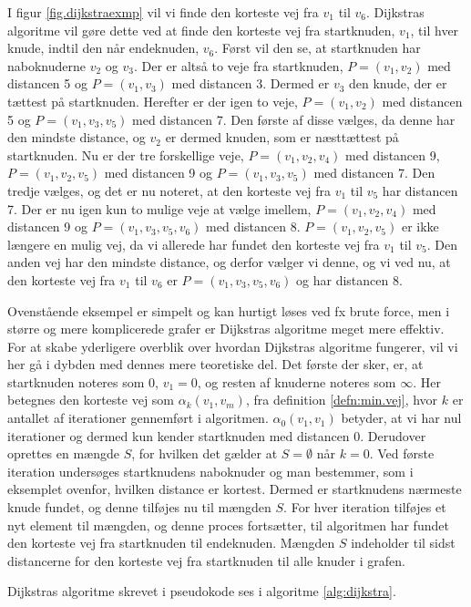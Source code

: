 \begin{exmp}

I figur \ref{fig.dijkstraexmp} vil vi finde den korteste vej fra $v_{1}$ til $v_{6}$. Dijkstras algoritme vil gøre dette ved at finde den korteste vej fra startknuden, $v_{1}$, til hver knude, indtil den når endeknuden, $v_{6}$. Først vil den se, at startknuden har naboknuderne $v_{2}$ og $v_{3}$. Der er altså to veje fra startknuden, $P=(v_{1},v_{2})$ med distancen 5 og $P=(v_{1},v_{3})$ med distancen 3. Dermed er $v_{3}$ den knude, der er tættest på startknuden. Herefter er der igen to veje, $P=(v_{1},v_{2})$ med distancen 5 og $P=(v_{1},v_{3},v_{5})$ med distancen 7. Den første af disse vælges, da denne har den mindste distance, og $v_{2}$ er dermed knuden, som er næsttættest på startknuden. Nu er der tre forskellige veje, $P=(v_{1},v_{2}, v_{4})$ med distancen 9, $P=(v_{1},v_{2}, v_{5})$ med distancen 9 og $P=(v_{1},v_{3}, v_{5})$ med distancen 7. Den tredje vælges, og det er nu noteret, at den korteste vej fra $v_{1}$ til $v_{5}$ har distancen 7. Der er nu igen kun to mulige veje at vælge imellem, $P=(v_{1},v_{2}, v_{4})$ med distancen 9 og $P=(v_{1},v_{3}, v_{5}, v_{6})$ med distancen 8. $P=(v_{1},v_{2}, v_{5})$ er ikke længere en mulig vej, da vi allerede har fundet den korteste vej fra $v_{1}$ til $v_{5}$. Den anden vej har den mindste distance, og derfor vælger vi denne, og vi ved nu, at den korteste vej fra $v_{1}$ til $v_{6}$ er $P=(v_{1},v_{3}, v_{5}, v_{6})$ og har distancen 8.
\end{exmp}
Ovenstående eksempel er simpelt og kan hurtigt løses ved fx brute force, men i større og mere komplicerede grafer er Dijkstras algoritme meget mere effektiv. For at skabe yderligere overblik over hvordan Dijkstras algoritme fungerer, vil vi her gå i dybden med dennes mere teoretiske del. Det første der sker, er, at startknuden noteres som $0$, $v_{1} = 0$, og resten af knuderne noteres som $\infty$. Her betegnes den korteste vej som $\alpha_{k}(v_1,v_m)$, fra definition \ref{defn:min.vej}, hvor $k$ er antallet af iterationer gennemført i algoritmen. $\alpha_{0}(v_1,v_1)$ betyder, at vi har nul iterationer og dermed kun kender startknuden med distancen 0. Derudover oprettes en mængde $S$, for hvilken det gælder at $S = \emptyset$ når $k = 0$. Ved første iteration undersøges startknudens naboknuder og man bestemmer, som i eksemplet ovenfor, hvilken distance er kortest. Dermed er startknudens nærmeste knude fundet, og denne tilføjes nu til mængden $S$. For hver iteration tilføjes et nyt element til mængden, og denne proces fortsætter, til algoritmen har fundet den korteste vej fra startknuden til endeknuden. Mængden $S$ indeholder til sidst distancerne for den korteste vej fra startknuden til alle knuder i grafen. 

Dijkstras algoritme skrevet i pseudokode ses i algoritme \ref{alg:dijkstra}.

